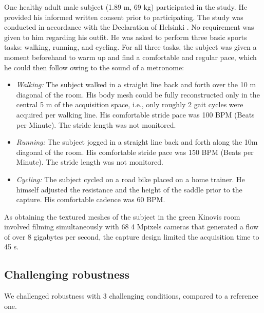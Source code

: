 One healthy adult male subject (1.89 m, 69 kg) participated in the study. He provided his informed written consent prior to participating. The study was conducted in accordance with the Declaration of Helsinki \cite{Holm2013}. No requirement was given to him regarding his outfit. He was asked to perform three basic sports tasks: walking, running, and cycling. For all three tasks, the subject was given a moment beforehand to warm up and find a comfortable and regular pace, which he could then follow owing to the sound of a metronome:

\begin{itemize}[itemsep=0em, topsep=0em, leftmargin=*]
      \item \textit{Walking:} The subject walked in a straight line back and forth over the 10 m diagonal of the room. His body mesh could be fully reconstructed only in the central 5 m of the acquisition space, i.e., only roughly 2 gait cycles were acquired per walking line. His comfortable stride pace was 100 BPM (Beats per Minute). The stride length was not monitored. 
      \item \textit{Running:} The subject jogged in a straight line back and forth along the 10m diagonal of the room. His comfortable stride pace was 150 BPM (Beats per Minute). The stride length was not monitored.
      \item \textit{Cycling:} The subject cycled on a road bike placed on a home trainer. He himself adjusted the resistance and the height of the saddle prior to the capture. His comfortable cadence was 60 BPM.
\end{itemize}
As obtaining the textured meshes of the subject in the green Kinovis room involved filming simultaneously with 68 4 Mpixels cameras that generated a flow of over 8 gigabytes per second, the capture design limited the acquisition time to 45 s.


\subsection{Challenging robustness}

We challenged robustness with 3 challenging conditions, compared to a reference one.


